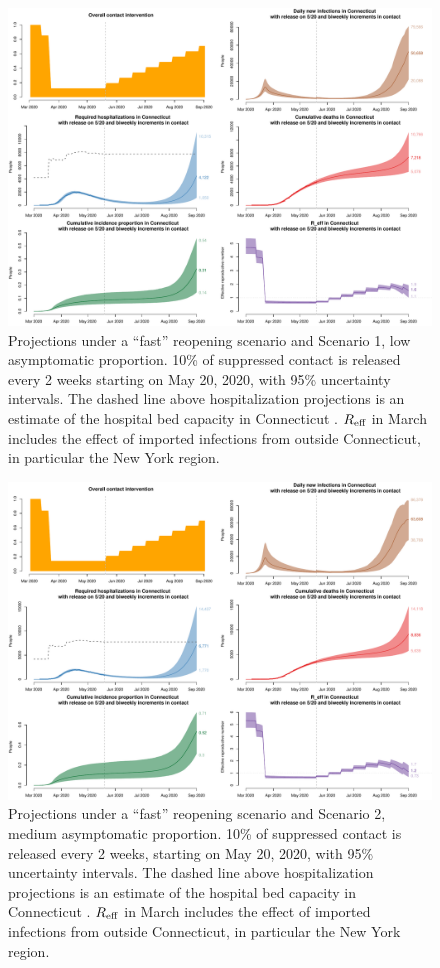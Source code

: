 \documentclass[11pt]{article}
\begin{document}
\begin{figure} %
	\centering
	\includegraphics[width=.9\textwidth]{figures/fast_low_full.pdf}
	\caption{Projections under a ``fast'' reopening scenario and Scenario 1, low asymptomatic proportion. 10\% of suppressed contact is released every 2 weeks starting on May 20, 2020, with 95\% uncertainty intervals. The dashed line above hospitalization projections is an estimate of the hospital bed capacity in Connecticut \citep{CHAwebsite}. $R\textsubscript{eff}$ in March includes the effect of imported infections from outside Connecticut, in particular the New York region.}
	\label{fig:fast_low}
\end{figure}

\begin{figure} %
	\centering
	\includegraphics[width=.9\textwidth]{figures/fast_medium_full.pdf}
	\caption{Projections under a ``fast'' reopening scenario and Scenario 2, medium asymptomatic proportion. 10\% of suppressed contact is released every 2 weeks, starting on May 20, 2020, with 95\% uncertainty intervals. The dashed line above hospitalization projections is an estimate of the hospital bed capacity in Connecticut \citep{CHAwebsite}. $R\textsubscript{eff}$ in March includes the effect of imported infections from outside Connecticut, in particular the New York region.}
	\label{fig:fast_medium}
\end{figure}
\end{document}

